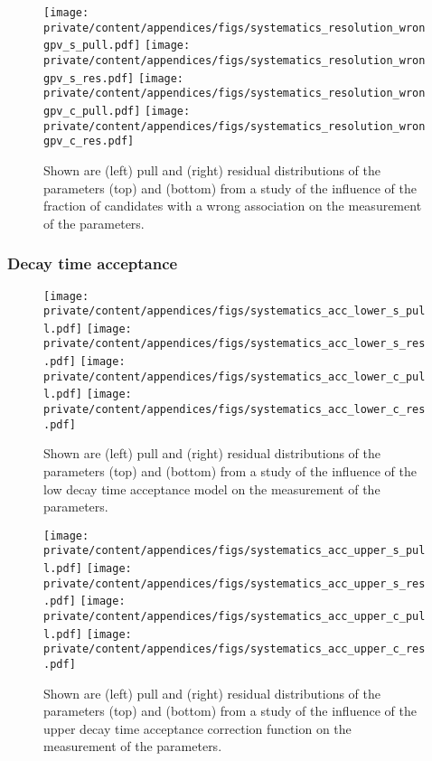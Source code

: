 \begin{figure}[h]
  \texttt{[image: private/content/appendices/figs/systematics\_resolution\_wrongpv\_s\_pull.pdf]}\hfill
  \texttt{[image: private/content/appendices/figs/systematics\_resolution\_wrongpv\_s\_res.pdf]}
  \texttt{[image: private/content/appendices/figs/systematics\_resolution\_wrongpv\_c\_pull.pdf]}\hfill
  \texttt{[image: private/content/appendices/figs/systematics\_resolution\_wrongpv\_c\_res.pdf]}
\caption{Shown are (left) pull and (right) residual distributions of the
parameters (top) \SJpsiKS and (bottom) \CJpsiKS from a \ToyMC study of the
influence of the fraction of candidates with a wrong \PV association on the
measurement of the \CP parameters.}
\label{fig:app:measurement_of_sin2beta:systematics:systematics:resolution:wrong_pv}
\end{figure}

\clearpage
\subsubsection{Decay time acceptance}
\label{sec:app:measurement_of_sin2beta:systematics:systematics:acceptance}

\begin{figure}[h]
  \texttt{[image: private/content/appendices/figs/systematics\_acc\_lower\_s\_pull.pdf]}\hfill
  \texttt{[image: private/content/appendices/figs/systematics\_acc\_lower\_s\_res.pdf]}
  \texttt{[image: private/content/appendices/figs/systematics\_acc\_lower\_c\_pull.pdf]}\hfill
  \texttt{[image: private/content/appendices/figs/systematics\_acc\_lower\_c\_res.pdf]}
\caption{Shown are (left) pull and (right) residual distributions of the
parameters (top) \SJpsiKS and (bottom) \CJpsiKS from a \ToyMC study of the
influence of the low decay time acceptance model on the measurement of the \CP
parameters.}
\label{fig:app:measurement_of_sin2beta:systematics:systematics:acceptance:lower}
\end{figure}

\begin{figure}[h]
  \texttt{[image: private/content/appendices/figs/systematics\_acc\_upper\_s\_pull.pdf]}\hfill
  \texttt{[image: private/content/appendices/figs/systematics\_acc\_upper\_s\_res.pdf]}
  \texttt{[image: private/content/appendices/figs/systematics\_acc\_upper\_c\_pull.pdf]}\hfill
  \texttt{[image: private/content/appendices/figs/systematics\_acc\_upper\_c\_res.pdf]}
\caption{Shown are (left) pull and (right) residual distributions of the
parameters (top) \SJpsiKS and (bottom) \CJpsiKS from a \ToyMC study of the
influence of the upper decay time acceptance correction function on the
measurement of the \CP parameters.}
\label{fig:app:measurement_of_sin2beta:systematics:systematics:acceptance:upper}
\end{figure}

